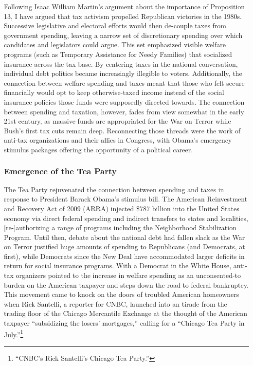 \documentclass[
]{article}
\begin{document}
Following Isaac William Martin's argument about the importance of Proposition 13, I have argued that tax activism propelled Republican victories in the 1980s.
Successive legislative and electoral efforts would then de-couple taxes from government spending, leaving a narrow set of discretionary spending over which candidates and legislators could argue.
This set emphasized visible welfare programs (such as Temporary Assistance for Needy Families) that socialized insurance across the tax base.
By centering taxes in the national conversation, individual debt politics became increasingly illegible to voters.
Additionally, the connection between welfare spending and taxes meant that those who felt secure financially would opt to keep otherwise-taxed income instead of the social insurance policies those funds were supposedly directed towards.
The connection between spending and taxation, however, fades from view somewhat in the early 21st century, as massive funds are appropriated for the War on Terror while Bush's first tax cuts remain deep.
Reconnecting those threads were the work of anti-tax organizations and their allies in Congress, with Obama's emergency stimulus packages offering the opportunity of a political career.

\hypertarget{emergence-of-the-tea-party}{%
\subsubsection{Emergence of the Tea Party}\label{emergence-of-the-tea-party}}

The Tea Party rejuvenated the connection between spending and taxes in response to President Barack Obama's stimulus bill.
The American Reinvestment and Recovery Act of 2009 (ARRA) injected \$787 billion into the United States economy via direct federal spending and indirect transfers to states and localities, {[}re-{]}authorizing a range of programs including the Neighborhood Stabilization Program.
Until then, debate about the national debt had fallen slack as the War on Terror justified huge amounts of spending to Republicans (and Democrats, at first), while Democrats since the New Deal have accommodated larger deficits in return for social insurance programs.
With a Democrat in the White House, anti-tax organizers pointed to the increase in welfare spending as an unconsented-to burden on the American taxpayer and steps down the road to federal bankruptcy.
This movement came to knock on the doors of troubled American homeowners when Rick Santelli, a reporter for CNBC, launched into an tirade from the trading floor of the Chicago Mercantile Exchange at the thought of the American taxpayer ``subsidizing the losers' mortgages,'' calling for a ``Chicago Tea Party in July.''\footnote{``CNBC's Rick Santelli's Chicago Tea Party.''}
\end{document}
